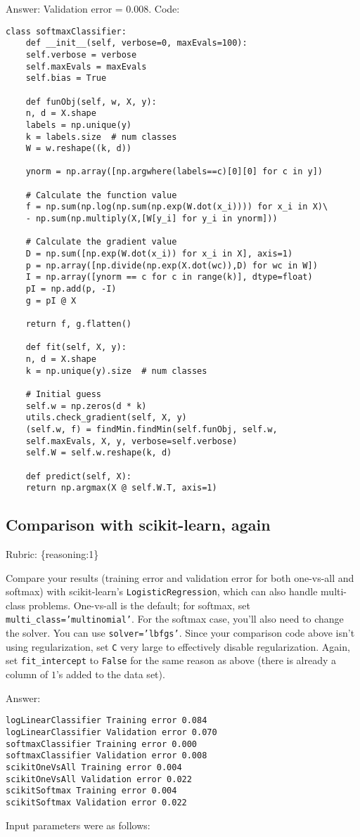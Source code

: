 \documentclass{article}
\def\rubric#1{\gre{Rubric: \{#1\}}}{}
\def\gre#1{{\color{gre}#1}}
\def\ans#1{\gre{Answer: #1}}{}
\begin{document}
\ans{Validation error = 0.008. Code:}
\begin{lstlisting}[style=base]
	class softmaxClassifier:
	def __init__(self, verbose=0, maxEvals=100):
	self.verbose = verbose
	self.maxEvals = maxEvals
	self.bias = True
	
	def funObj(self, w, X, y):
	n, d = X.shape
	labels = np.unique(y)
	k = labels.size  # num classes
	W = w.reshape((k, d))
	
	ynorm = np.array([np.argwhere(labels==c)[0][0] for c in y])
	
	# Calculate the function value
	f = np.sum(np.log(np.sum(np.exp(W.dot(x_i)))) for x_i in X)\
	- np.sum(np.multiply(X,[W[y_i] for y_i in ynorm]))
	
	# Calculate the gradient value
	D = np.sum([np.exp(W.dot(x_i)) for x_i in X], axis=1)
	p = np.array([np.divide(np.exp(X.dot(wc)),D) for wc in W])
	I = np.array([ynorm == c for c in range(k)], dtype=float)
	pI = np.add(p, -I)
	g = pI @ X
	
	return f, g.flatten()
	
	def fit(self, X, y):
	n, d = X.shape
	k = np.unique(y).size  # num classes
	
	# Initial guess
	self.w = np.zeros(d * k)
	utils.check_gradient(self, X, y)
	(self.w, f) = findMin.findMin(self.funObj, self.w,
	self.maxEvals, X, y, verbose=self.verbose)
	self.W = self.w.reshape(k, d)
	
	def predict(self, X):
	return np.argmax(X @ self.W.T, axis=1)
\end{lstlisting}


\subsection{Comparison with scikit-learn, again}
\rubric{reasoning:1}

Compare your results (training error and validation error for both one-vs-all and softmax) with scikit-learn's \texttt{LogisticRegression},
which can also handle multi-class problems.
One-vs-all is the default; for softmax, set \texttt{multi\string_class='multinomial'}. For the softmax case,
you'll also need to change the solver. You can use \texttt{solver='lbfgs'}.
Since your comparison code above isn't using regularization, set \texttt{C} very large to effectively disable regularization.
Again, set \texttt{fit\string_intercept} to \texttt{False} for the same reason as above (there is already a column of $1$'s added to the data set).

\ans{}
\begin{verbatim}
logLinearClassifier Training error 0.084
logLinearClassifier Validation error 0.070
softmaxClassifier Training error 0.000
softmaxClassifier Validation error 0.008
scikitOneVsAll Training error 0.004
scikitOneVsAll Validation error 0.022
scikitSoftmax Training error 0.004
scikitSoftmax Validation error 0.022
\end{verbatim}
\gre{Input parameters were as follows:}
\end{document}
